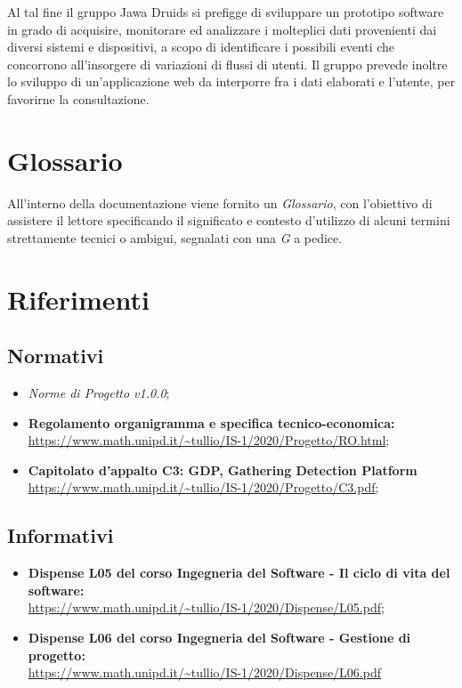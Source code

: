 Al tal fine il gruppo Jawa Druids si prefigge di sviluppare un prototipo software in grado di acquisire, monitorare ed analizzare i molteplici dati provenienti dai diversi sistemi e dispositivi, a scopo di identificare i possibili eventi che concorrono all’insorgere di variazioni di flussi di utenti. Il gruppo prevede inoltre lo sviluppo di un'applicazione web da interporre fra i dati elaborati e l'utente, per favorirne la consultazione.

\section{Glossario}\label{IntroduzioneGlossario}

All'interno della documentazione viene fornito un \textit{Glossario}, con l'obiettivo di assistere il lettore specificando il significato e contesto d'utilizzo di alcuni termini strettamente tecnici o ambigui, segnalati con una \textit{G} a pedice.

\section{Riferimenti} \label{IntroduzioneRiferimenti}
\subsection{Normativi} \label{IntroduzioneRiferimentiNormativi}
\begin{itemize}
	\item \textit{Norme di Progetto v1.0.0};
	\item \textbf{Regolamento organigramma e specifica tecnico-economica:} \\
	\url{https://www.math.unipd.it/~tullio/IS-1/2020/Progetto/RO.html};
	\item \textbf{Capitolato d'appalto C3: GDP, Gathering Detection Platform}\\
	\url{https://www.math.unipd.it/~tullio/IS-1/2020/Progetto/C3.pdf};
\end{itemize}
\subsection{Informativi} \label{IntroduzioneRiferimentiInformativi}
\begin{itemize}
	\item \textbf{Dispense L05 del corso Ingegneria del Software - Il ciclo di vita del software:}\\
	\url{https://www.math.unipd.it/~tullio/IS-1/2020/Dispense/L05.pdf};
	\item \textbf{Dispense L06 del corso Ingegneria del Software - Gestione di progetto:} \\
	\url{https://www.math.unipd.it/~tullio/IS-1/2020/Dispense/L06.pdf}
\end{itemize}

